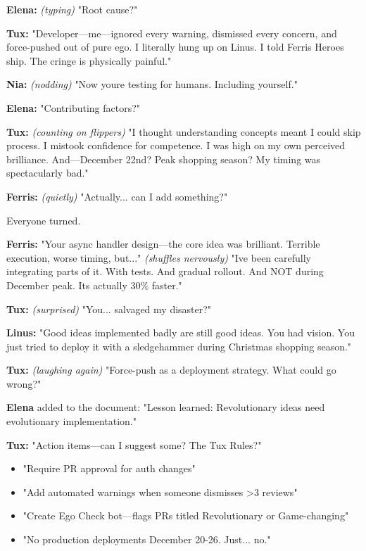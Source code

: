 \textbf{Elena:} \emph{(typing)} "Root cause?"

\textbf{Tux:} "Developer---me---ignored every warning, dismissed every concern, and force-pushed out of pure ego. I literally hung up on Linus. I told Ferris \textquotesingle Heroes ship.\textquotesingle{} The cringe is physically painful."

\textbf{Nia:} \emph{(nodding)} "Now you\textquotesingle re testing for humans. Including yourself."

\textbf{Elena:} "Contributing factors?"

\textbf{Tux:} \emph{(counting on flippers)} "I thought understanding concepts meant I could skip process. I mistook confidence for competence. I was high on my own perceived brilliance. And---December 22nd? Peak shopping season? My timing was spectacularly bad."

\textbf{Ferris:} \emph{(quietly)} "Actually... can I add something?"

Everyone turned.

\textbf{Ferris:} "Your async handler design---the core idea was brilliant. Terrible execution, worse timing, but..." \emph{(shuffles nervously)} "I\textquotesingle ve been carefully integrating parts of it. With tests. And gradual rollout. And NOT during December peak. It\textquotesingle s actually 30\% faster."

\textbf{Tux:} \emph{(surprised)} "You... salvaged my disaster?"

\textbf{Linus:} "Good ideas implemented badly are still good ideas. You had vision. You just tried to deploy it with a sledgehammer during Christmas shopping season."

\textbf{Tux:} \emph{(laughing again)} "Force-push as a deployment strategy. What could go wrong?"

\textbf{Elena} added to the document: "Lesson learned: Revolutionary ideas need evolutionary implementation."

\textbf{Tux:} "Action items---can I suggest some? The \textquotesingle Tux Rules\textquotesingle?"

\begin{itemize}
\tightlist
\item
  "Require PR approval for auth changes"
\item
  "Add automated warnings when someone dismisses \textgreater3 reviews"
\item
  "Create \textquotesingle Ego Check\textquotesingle{} bot---flags PRs titled \textquotesingle Revolutionary\textquotesingle{} or \textquotesingle Game-changing\textquotesingle"
\item
  "No production deployments December 20-26. Just... no."
\end{itemize}

